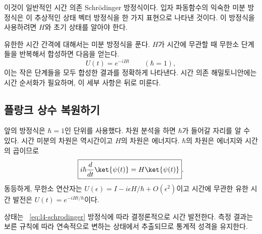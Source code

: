 이것이 일반적인 시간 의존 Schr\"odinger 방정식이다. 입자 파동함수의 익숙한 미분 방정식은 이 추상적인 상태 벡터 방정식을 한 가지 표현으로 나타낸 것이다. 이 방정식을 사용하려면 \(H\)와 초기 상태를 알아야 한다.

유한한 시간 간격에 대해서는 미분 방정식을 푼다. \(H\)가 시간에 무관할 때 무한소 단계들을 반복해서 합성하면 다음을 얻는다. \begin{equation}
U(t)=e^{-iHt}
\qquad(\hbar=1),
\end{equation}이는 작은 단계들을 모두 합성한 결과를 정확하게 나타낸다. 시간 의존 해밀토니안에는 시간 순서화가 필요하며, 이 세부 사항은 뒤로 미룬다.

\begin{classroomqa}\end{classroomqa}

\subsection{플랑크 상수 복원하기}

앞의 방정식은 \(\hbar=1\)인 단위를 사용했다. 차원 분석을 하면 \(\hbar\)가 들어갈 자리를 알 수 있다. 시간 미분의 차원은 역시간이고 \(H\)의 차원은 에너지다. \(\hbar\)의 차원은 에너지와 시간의 곱이므로 \begin{equation}
\boxed{i\hbar\frac{d}{dt}\ket{\psi(t)}=H\ket{\psi(t)}}.
\label{eq:l4-schrodinger}
\end{equation}동등하게, 무한소 연산자는 \(U(\epsilon)=I-i\epsilon H/\hbar+O(\epsilon^2)\)이고 시간에 무관한 유한 시간 발전은 \(U(t)=e^{-iHt/\hbar}\)이다.

\begin{classroomqa}\end{classroomqa}

상태는 ~\eqref{eq:l4-schrodinger} 방정식에 따라 결정론적으로 시간 발전한다. 측정 결과는 보른 규칙에 따라 연속적으로 변하는 상태에서 추출되므로 통계적 성격을 유지한다.

